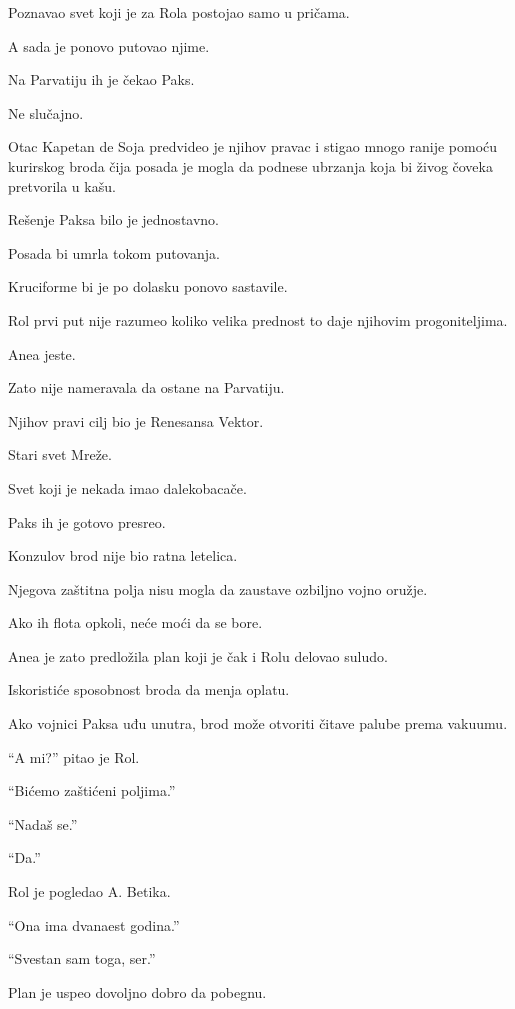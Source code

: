 Poznavao svet koji je za Rola postojao samo u pričama.

A sada je ponovo putovao njime.

\bigskip

Na Parvatiju ih je čekao Paks.

Ne slučajno.

Otac Kapetan de Soja predvideo je njihov pravac i stigao mnogo ranije pomoću kurirskog broda čija posada je mogla da podnese ubrzanja koja bi živog čoveka pretvorila u kašu.

Rešenje Paksa bilo je jednostavno.

Posada bi umrla tokom putovanja.

Kruciforme bi je po dolasku ponovo sastavile.

\bigskip

Rol prvi put nije razumeo koliko velika prednost to daje njihovim progoniteljima.

Anea jeste.

Zato nije nameravala da ostane na Parvatiju.

Njihov pravi cilj bio je Renesansa Vektor.

Stari svet Mreže.

Svet koji je nekada imao dalekobacače.

\bigskip

Paks ih je gotovo presreo.

Konzulov brod nije bio ratna letelica.

Njegova zaštitna polja nisu mogla da zaustave ozbiljno vojno oružje.

Ako ih flota opkoli, neće moći da se bore.

Anea je zato predložila plan koji je čak i Rolu delovao suludo.

Iskoristiće sposobnost broda da menja oplatu.

Ako vojnici Paksa uđu unutra, brod može otvoriti čitave palube prema vakuumu.

\bigskip

``A mi?'' pitao je Rol.

``Bićemo zaštićeni poljima.''

``Nadaš se.''

``Da.''

Rol je pogledao A. Betika.

``Ona ima dvanaest godina.''

``Svestan sam toga, ser.''

\bigskip

Plan je uspeo dovoljno dobro da pobegnu.

